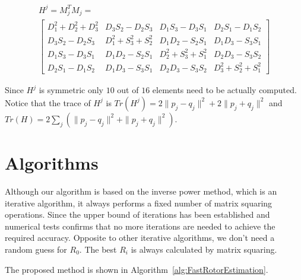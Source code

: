\documentclass{birkjour}
\numberwithin{equation}{section}
\begin{document}
\begin{eqnarray*}
H^j = M_j^T M_j =\\
\left[\begin{array}{cccc}
D_1^2 + D_2^2 + D_3^2    & D_3 S_2 - D_2 S_3      & D_1 S_3 - D_3 S_1     & D_2 S_1 - D_1 S_2\\ 
D_3 S_2 - D_2 S_3        & D_1^2 + S_3^2 + S_2^2  & D_1 D_2 - S_2 S_1     & D_1 D_3 - S_3 S_1 \\
D_1 S_3 - D_3 S_1        & D_1 D_2 - S_2 S_1      & D_2^2 + S_3^2 + S_1^2 & D_2 D_3 - S_3 S_2\\ 
D_2 S_1 - D_1 S_2        & D_1 D_3 - S_3 S_1      & D_2 D_3 - S_3 S_2     & D_3^2 + S_2^2 + S_1^2
\end{array}\right]
\end{eqnarray*}

Since $H^j$ is symmetric only $10$ out of $16$ elements need to be actually computed. Notice that the trace of $H^j$ is $Tr(H^j) = 2 \|p_j - q_j\|^2 + 2 \|p_j + q_j\|^2$ and $Tr(H) = 2 \sum_j {(\|p_j - q_j\|^2 + \|p_j + q_j\|^2)}$.

\section{Algorithms}

Although our algorithm is based on the inverse power method, which is an iterative algorithm, it always performs a fixed number of matrix squaring operations. Since the upper bound of iterations has been established and numerical tests confirms that no more iterations are needed to achieve the required accuracy. Opposite to other iterative algorithms, we don't need a random guess for $R_0$. The best $R_i$ is always calculated by matrix squaring. %

The proposed method is shown in Algorithm~\ref{alg:FastRotorEstimation}. 
\end{document}
